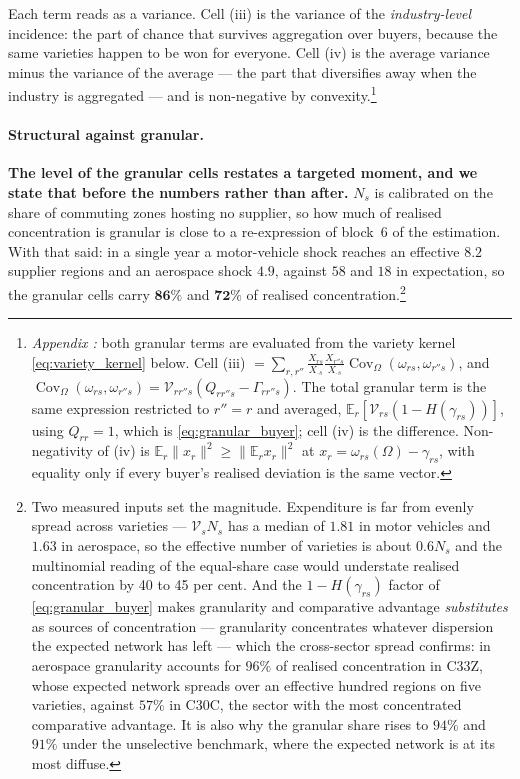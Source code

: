 Each term reads as a variance. Cell (iii) is the variance of the \emph{industry-level} incidence: the part of chance that survives aggregation over buyers, because the same varieties happen to be won for everyone. Cell (iv) is the average variance minus the variance of the average --- the part that diversifies away when the industry is aggregated --- and is non-negative by convexity.\footnote{\emph{Appendix :} both granular terms are evaluated from the variety kernel \eqref{eq:variety_kernel} below. Cell (iii) $=\sum_{r,r''}\tfrac{X_{rs}}{X_{\cdot s}}\tfrac{X_{r''s}}{X_{\cdot s}}\operatorname{Cov}_{\Omega}(\omega_{rs},\omega_{r''s})$, and $\operatorname{Cov}_{\Omega}(\omega_{rs},\omega_{r''s})=\mathcal V_{rr''s}(Q_{rr''s}-\Gamma_{rr''s})$. The total granular term is the same expression restricted to $r''=r$ and averaged, $\mathbb{E}_r[\mathcal V_{rs}(1-H(\gamma_{rs}))]$, using $Q_{rr}=1$, which is \eqref{eq:granular_buyer}; cell (iv) is the difference. Non-negativity of (iv) is $\mathbb{E}_r\|x_r\|^2\ge\|\mathbb{E}_r x_r\|^2$ at $x_r=\omega_{rs}(\Omega)-\gamma_{rs}$, with equality only if every buyer's realised deviation is the same vector.}

\paragraph{Structural against granular.}
\textbf{The level of the granular cells restates a targeted moment, and we state that before the numbers rather than after.} $N_{s}$ is calibrated on the share of commuting zones hosting no supplier, so how much of realised concentration is granular is close to a re-expression of block~6 of the estimation. With that said: in a single year a motor-vehicle shock reaches an effective $8.2$ supplier regions and an aerospace shock $4.9$, against $58$ and $18$ in expectation, so the granular cells carry $\mathbf{86\%}$ and $\mathbf{72\%}$ of realised concentration.\footnote{Two measured inputs set the magnitude. Expenditure is far from evenly spread across varieties --- $\mathcal{V}_{s}N_{s}$ has a median of $1.81$ in motor vehicles and $1.63$ in aerospace, so the effective number of varieties is about $0.6N_{s}$ and the multinomial reading of the equal-share case would understate realised concentration by 40 to 45 per cent. And the $1-H(\gamma_{rs})$ factor of \eqref{eq:granular_buyer} makes granularity and comparative advantage \emph{substitutes} as sources of concentration --- granularity concentrates whatever dispersion the expected network has left --- which the cross-sector spread confirms: in aerospace granularity accounts for $96\%$ of realised concentration in C33Z, whose expected network spreads over an effective hundred regions on five varieties, against $57\%$ in C30C, the sector with the most concentrated comparative advantage. It is also why the granular share rises to $94\%$ and $91\%$ under the unselective benchmark, where the expected network is at its most diffuse.}

